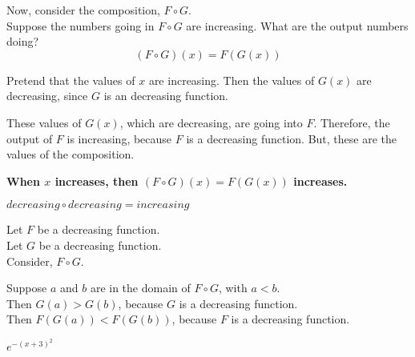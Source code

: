 \documentclass{ximera}
\begin{document}
Now, consider the composition, $F \circ G$. \\


Suppose the numbers going in $F \circ G$ are increasing.  What are the output numbers doing? \\




\[ (F \circ G)(x) = F(G(x)) \]


Pretend that the values of $x$ are increasing. Then the values of $G(x)$ are decreasing, since $G$ is an decreasing function.

These values of $G(x)$, which are decreasing, are going into $F$.  Therefore, the output of $F$ is increasing, because $F$ is a decreasing function.  But, these are the values of the composition.



\begin{center}
\textbf{\textcolor{red!80!black}{When $x$ increases, then $(F \circ G)(x) = F(G(x))$ increases.}}
\end{center}






\begin{fact}
$decreasing \circ decreasing = increasing$


Let $F$ be a decreasing function. \\
Let $G$ be a decreasing function. \\


Consider, $F \circ G$.

Suppose $a$ and $b$ are in the domain of $F \circ G$, with $a < b$. \\

Then $G(a) > G(b)$, because $G$ is a decreasing function. \\

Then $F(G(a)) < F(G(b))$, because $F$ is a decreasing function.


\end{fact}







\begin{example}   $e^{-(x+3)^2}$




\end{example}
\end{document}
